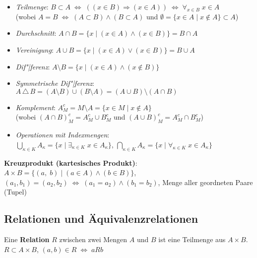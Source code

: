 \begin{itemize}
    \item \emph{Teilmenge}: $B \subset A \;\Leftrightarrow\;
    ((x \in B) \Rightarrow (x \in A)) \;\Leftrightarrow\;
    \forall_{x \in B}\; x \in A$
    \\ (wobei
    $A = B \;\Leftrightarrow\; (A \subset B) \land (B \subset A)$ und
    $\emptyset = \{x \in A \;|\; x \notin A\} \subset A$)

    \item \emph{Durchschnitt}:
    $A \cap B = \{x \;|\; (x \in A) \land (x \in B)\} = B \cap A$

    \item \emph{Vereinigung}: $A \cup B = \{x \;|\; (x \in A) \lor (x \in B)\}
    = B \cup A$

    \item \emph{Dif"|ferenz}: $A \setminus B = \{x \;|\; (x \in A) \land
    (x \notin B)\}$

    \item \emph{Symmetrische Dif"|ferenz}: $A \,\triangle\, B =
    (A \setminus B) \cup (B \setminus A) = (A \cup B) \setminus (A \cap B)$

    \item \emph{Komplement}:
    $A_M^c = M \setminus A = \{x \in M \;|\; x \notin A\}$ \\
    (wobei
    $(A \cap B)_M^c = A_M^c \cup B_M^c$ und
    $(A \cup B)_M^c = A_M^c \cap B_M^c$)

    \item \emph{Operationen mit Indexmengen}: \\
    $\bigcup_{\kappa \in K} A_\kappa =
    \{x \;|\; \exists_{\kappa \in K}\; x \in A_\kappa\}$,
    $\bigcap_{\kappa \in K} A_\kappa =
    \{x \;|\; \forall_{\kappa \in K}\; x \in A_\kappa\}$
\end{itemize}

\textbf{Kreuzprodukt (kartesisches Produkt)}:
$A \times B = \{(a,\; b) \;|\; (a \in A) \land (b \in B)\}$, \\
$(a_1, b_1) = (a_2, b_2) \;\Leftrightarrow\; (a_1 = a_2) \land (b_1 = b_2)$,
Menge aller geordneten Paare (Tupel)

\subsection{%
    Relationen und Äquivalenzrelationen%
}

Eine \textbf{Relation} $R$ zwischen zwei Mengen $A$ und $B$ ist eine Teilmenge
aus $A \times B$. \\
$R \subset A \times B$, $(a,b) \in R \;\Leftrightarrow\; a R b$


